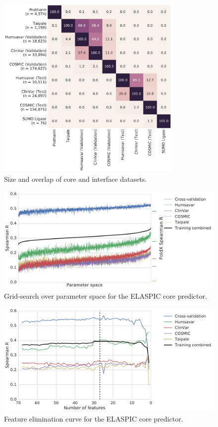 \begin{figure}[!htb]
	\centering
	\includegraphics[width=0.8\textwidth]{static/elaspic_training_set/data_statistics/training_set_overlap_data_df_tt_core.pdf}
	\caption[Core predictor datasets.]{Size and overlap of core and interface datasets.}
\end{figure}


\begin{figure}[!htb]
	\includegraphics[width=0.9\linewidth]{static/elaspic_training_set/machine_learning/gridsearch_core.pdf}
	\caption{Grid-search over parameter space for the ELASPIC core predictor.}
	\label{fig:gridsearch_core}
\end{figure}


\begin{figure}[!htb]
	\includegraphics[width=0.9\linewidth]{static/elaspic_training_set/machine_learning/feature_elimination_core.pdf}
	\caption{Feature elimination curve for the ELASPIC core predictor.}
	\label{fig:feature_elimination_core}
\end{figure}


